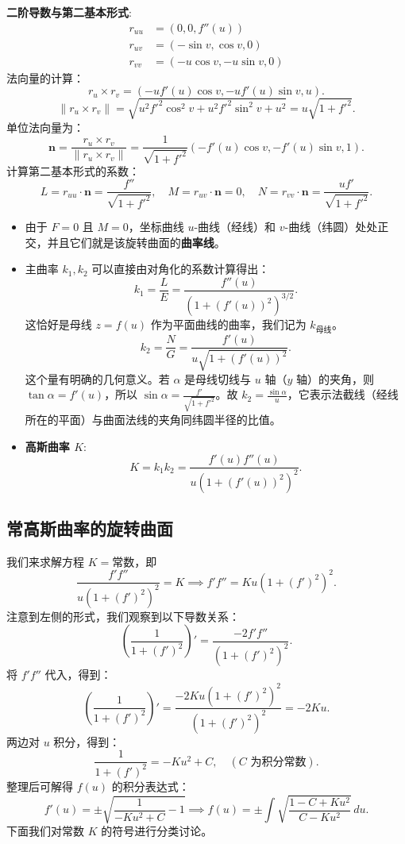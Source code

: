 \documentclass[lang=cn,10pt,thmcnt=section]{elegantbook}
\renewcommand{\vec}[1]{\mathbf{#1}}
\begin{document}
\textbf{二阶导数与第二基本形式}:
\begin{align*}
    r_{uu} &= (0, 0, f''(u)) \\
    r_{uv} &= (-\sin v, \cos v, 0) \\
    r_{vv} &= (-u \cos v, -u \sin v, 0)
\end{align*}
法向量的计算：
\[
r_{u} \times r_{v} = (-uf'(u)\cos v, -uf'(u)\sin v, u).
\]
\[
\|r_u \times r_v\| = \sqrt{u^2f'^2\cos^2v + u^2f'^2\sin^2v + u^2} = u\sqrt{1+f'^2}.
\]
单位法向量为：
\[
\vec{n} = \frac{r_{u} \times r_{v}}{\|r_{u} \times r_{v}\|} = \frac{1}{\sqrt{1 + f'^2}} (-f'(u)\cos v, -f'(u)\sin v, 1).
\]
计算第二基本形式的系数：
\[
L = r_{uu} \cdot \vec{n} = \frac{f''}{\sqrt{1 + f'^2}}, \quad M = r_{uv} \cdot \vec{n} = 0, \quad N = r_{vv} \cdot \vec{n} = \frac{uf'}{\sqrt{1 + f'^2}}.
\]\begin{itemize}
    \item 由于 $F=0$ 且 $M=0$，坐标曲线 $u$-曲线（经线）和 $v$-曲线（纬圆）处处正交，并且它们就是该旋转曲面的\textbf{曲率线}。

    \item 主曲率 $k_1, k_2$ 可以直接由对角化的系数计算得出：
    \[
    k_1 = \frac{L}{E} = \frac{f''(u)}{(1 + (f'(u))^2)^{3/2}}.
    \]
    这恰好是母线 $z=f(u)$ 作为平面曲线的曲率，我们记为 $k_{\text{母线}}$。
    \[
    k_2 = \frac{N}{G} = \frac{f'(u)}{u \sqrt{1 + (f'(u))^2}}.
    \]
    这个量有明确的几何意义。若 $\alpha$ 是母线切线与 $u$ 轴（$y$ 轴）的夹角，则 $\tan\alpha = f'(u)$，所以 $\sin\alpha = \frac{f'}{\sqrt{1+f'^2}}$。故 $k_2 = \frac{\sin\alpha}{u}$，它表示法截线（经线所在的平面）与曲面法线的夹角同纬圆半径的比值。

    \item \textbf{高斯曲率 $K$}:
    \[
    K = k_1 k_2 = \frac{f'(u)f''(u)}{u(1+(f'(u))^2)^2}.
    \]
\end{itemize}
\subsection{常高斯曲率的旋转曲面}
我们来求解方程 $K = \text{常数}$，即
\[
\frac{f'f''}{u(1+(f')^2)^2} = K \implies f'f'' = Ku(1+(f')^2)^2.
\]
注意到左侧的形式，我们观察到以下导数关系：
\[
\left(\frac{1}{1 + (f')^2}\right)' = \frac{-2f'f''}{(1 + (f')^2)^2}.
\]
将 $f'f''$ 代入，得到：
\[
\left(\frac{1}{1 + (f')^2}\right)' = \frac{-2Ku(1+(f')^2)^2}{(1+(f')^2)^2} = -2Ku.
\]
两边对 $u$ 积分，得到：
\[
\frac{1}{1 + (f')^2} = -Ku^2 + C, \quad (C \text{ 为积分常数}).
\]
整理后可解得 $f(u)$ 的积分表达式：
\[
f'(u) = \pm \sqrt{\frac{1}{-Ku^2+C}-1} \implies f(u) = \pm \int \sqrt{\frac{1-C+Ku^2}{C-Ku^2}} \, du.
\]
下面我们对常数 $K$ 的符号进行分类讨论。
\end{document}
